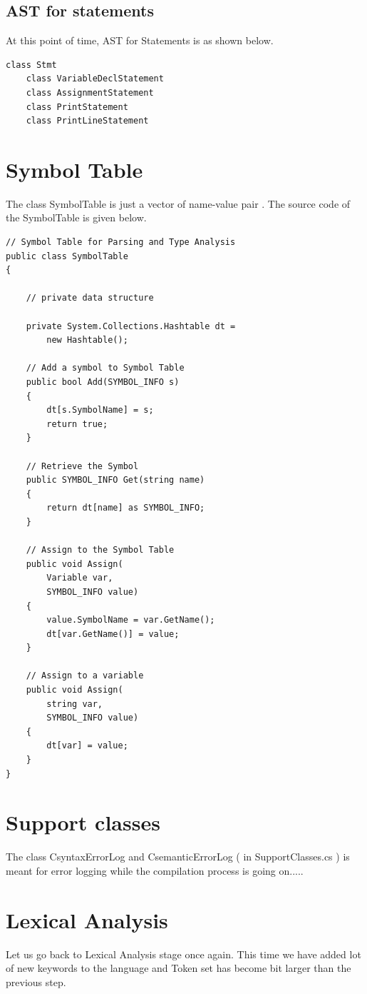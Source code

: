 \subsection{AST for statements}
At this point of time, AST for Statements is as shown below.
\begin{verbatim}
class Stmt
	class VariableDeclStatement
	class AssignmentStatement
	class PrintStatement
	class PrintLineStatement
\end{verbatim}

\section{Symbol Table}
The class SymbolTable is just a vector of name-value pair . The source code of the SymbolTable is given below.

\lstset{style=csharp}
\begin{lstlisting}
// Symbol Table for Parsing and Type Analysis
public class SymbolTable
{
	
	// private data structure

	private System.Collections.Hashtable dt = 
		new Hashtable();

	// Add a symbol to Symbol Table
	public bool Add(SYMBOL_INFO s)
	{
		dt[s.SymbolName] = s;
		return true;
	}

	// Retrieve the Symbol
	public SYMBOL_INFO Get(string name)
	{
		return dt[name] as SYMBOL_INFO;
	}
	
	// Assign to the Symbol Table
	public void Assign(
		Variable var, 
		SYMBOL_INFO value)
	{
		value.SymbolName = var.GetName();
		dt[var.GetName()] = value;
	}

	// Assign to a variable
	public void Assign(
		string var, 
		SYMBOL_INFO value)
	{
		dt[var] = value;
	}
}
\end{lstlisting}
\section{Support classes}
The class CsyntaxErrorLog and CsemanticErrorLog ( in SupportClasses.cs ) is meant for error logging
while the compilation process is going on.....
\section{Lexical Analysis}
Let us go back to Lexical Analysis stage once again. This time we have added lot of new keywords to the language and Token set has become bit larger than the previous step.
